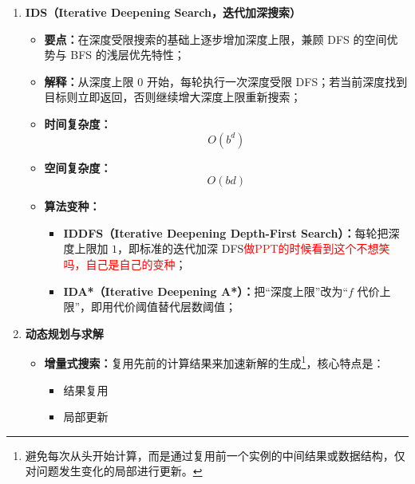 \documentclass[../main.tex]{subfiles}
\begin{document}
\begin{enumerate}
\begin{itemize}
        \item \textbf{算法变种：}
        \begin{itemize}
            \item \textbf{LRTA*（Learning Real-Time A*）：}在每次移动后更新已访问状态的启发值，即加入“学习”机制；
            \item \textbf{RTAA*（Real-Time Adaptive A*）：}在 RTA* 基础上加入有限深度前瞻搜索，即一次看得更远；
            \item \textbf{DTA*（Dynamic Real-Time A*）：}面向动态环境进一步调整搜索与更新策略，即增强对环境变化的适应性。
        \end{itemize}
    \end{itemize}
    \item \textbf{IDS（Iterative Deepening Search，迭代加深搜索）}
    \begin{itemize}
        \item \textbf{要点：}在深度受限搜索的基础上逐步增加深度上限，兼顾 DFS 的空间优势与 BFS 的浅层优先特性；
        \item \textbf{解释：}从深度上限 $0$ 开始，每轮执行一次深度受限 DFS；若当前深度找到目标则立即返回，否则继续增大深度上限重新搜索；
        \item \textbf{时间复杂度：}
        $$
        O(b^d)
        $$
        \item \textbf{空间复杂度：}
        $$
        O(bd)
        $$
        \item \textbf{算法变种：}
        \begin{itemize}
            \item \textbf{IDDFS（Iterative Deepening Depth-First Search）：}每轮把深度上限加 $1$，即标准的迭代加深 DFS\textcolor{red}{做PPT的时候看到这个不想笑吗，自己是自己的变种}；
            \item \textbf{IDA*（Iterative Deepening A*）：}把“深度上限”改为“$f$ 代价上限”，即用代价阈值替代层数阈值；
        \end{itemize}
    \end{itemize}
    \item \textbf{动态规划与求解}
    \begin{itemize}
        \item \textbf{增量式搜索：}复用先前的计算结果来加速新解的生成\footnote{避免每次从头开始计算，而是通过复用前一个实例的中间结果或数据结构，仅对问题发生变化的局部进行更新。}，核心特点是：
        \begin{itemize}
            \item 结果复用
            \item 局部更新

\end{itemize}
\end{itemize}
\end{enumerate}
\end{document}

